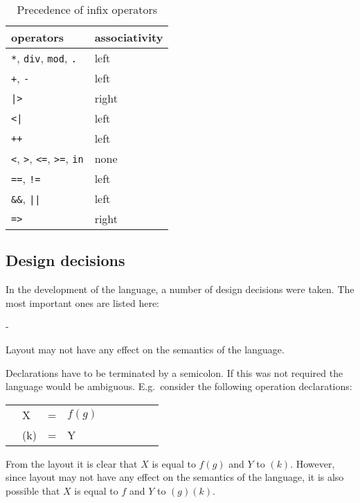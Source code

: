 \documentclass[a4paper,fleqn]{article}
\makeatletter
\newenvironment{tdefinitions}[2][0.15em]
  {\begin{list}%
    {#2}%
    {\setlength{\parsep}{0pt}%
     \setlength{\itemsep}{#1}%
     \setlength{\leftmargin}{\mathindent}%
     \setlength{\labelwidth}{\mathindent - \labelsep}%
    }
  }
  {\end{list}}
\newcommand{\frm}[1]{\mbox{\ensuremath{#1}}}
\newcommand{\f}[1]{\ensuremath{\mathit{#1}}}
\newcommand{\fa}[2]{\ensuremath{\f{#1}(#2)}}
\newlength{\tlength}
\newenvironment{mCRL2}%
{\par\bigskip\noindent%
 \begin{tabular}{@{}>{\bf}p{2.3em}L@{\ }L@{\ }L@{\ }L@{\ }L@{\ }L@{\ }L@{\ }L}%
}%
{\end{tabular}\bigskip\par%
}
\makeatother
\begin{document}
\begin{table}[h!bt]
\centering
\begin{tabular}{|ll|}
\hline
operators                                           & associativity\\\hline
\verb+*+, \verb+div+, \verb+mod+, \verb+.+          & left\\
\verb-+-, \verb+-+                                  & left\\
\verb+|>+                                           & right\\
\verb+<|+                                           & left\\
\verb-++-                                           & left\\
\verb+<+, \verb+>+, \verb+<=+, \verb+>=+, \verb+in+ & none\\
\verb+==+, \verb+!=+                                & left\\
\verb+&&+, \verb+||+                                & left\\
\verb+=>+                                           & right\\\hline
\end{tabular}
\caption{Precedence of infix operators}
\label{tab:precedence}
\end{table}

\subsection{Design decisions}

In the development of the language, a number of design decisions were taken.
The most important ones are listed here:
\begin{tdefinitions}{-}
\item Layout may not have any effect on the semantics of the language.
\item Declarations have to be terminated by a semicolon. If this was not
required the language would be ambiguous. E.g.\ consider the following
operation declarations:
\begin{mCRL2}
& X   & = & \fa{f}{g}\\
& (k) & = & Y\\
\end{mCRL2}
From the layout it is clear that \frm{X} is equal to \frm{\fa{f}{g}} and
\frm{Y} to \frm{(k)}. However, since layout may not have any effect on the
semantics of the language, it is also possible that \frm{X} is equal to
\frm{f} and \frm{Y} to \frm{\fa{(g)}{k}}.
\end{tdefinitions}
\end{document}
